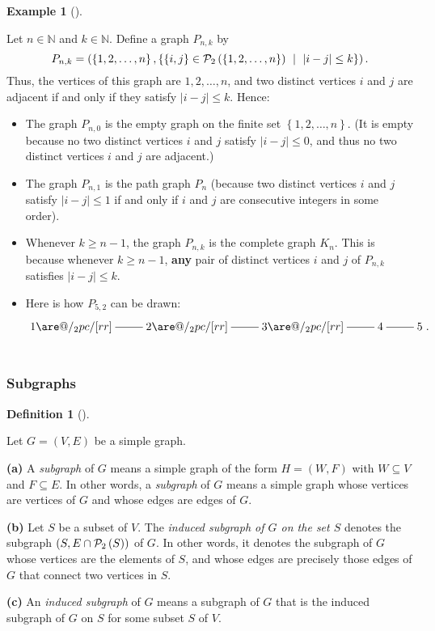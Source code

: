 \documentclass[numbers=enddot,12pt,final,onecolumn,notitlepage]{scrartcl}%
\makeatletter
\theoremstyle{definition}
\newtheorem{defi}[theo]{Definition}
\newenvironment{definition}[1][]
{\begin{defi}[#1]\begin{leftbar}}
{\end{leftbar}\end{defi}}
\newtheorem{exam}[theo]{Example}
\newenvironment{example}[1][]
{\begin{exam}[#1]\begin{leftbar}}
{\end{leftbar}\end{exam}}
\newcommand{\NN}{\mathbb{N}}
\newcommand{\powset}[2][]{\ifthenelse{\equal{#2}{}}{\mathcal{P}\left(#1\right)}{\mathcal{P}_{#1}\left(#2\right)}}
\newcommand{\set}[1]{\left\{ #1 \right\}}
\newcommand{\abs}[1]{\left| #1 \right|}
\newcommand{\tup}[1]{\left( #1 \right)}
\newcommand{\are}{\ar@{-}}
\makeatother
\begin{document}
\begin{example} \label{exa.intro.interval-graph-easy}
Let $n \in \NN$ and $k \in \NN$. Define a graph $P_{n, k}$ by
\[
P_{n, k}
= \tup{\set{1, 2, \ldots, n},
       \set{ \set{i, j} \in \powset[2]{\set{1, 2, \ldots, n}} \ \mid
             \  \abs{i-j} \leq k }} .
\]
Thus, the vertices of this graph are $1, 2, \ldots, n$, and two
distinct vertices $i$ and $j$ are adjacent if and only if they
satisfy $\abs{i-j} \leq k$. Hence:
\begin{itemize}
\item The graph $P_{n, 0}$ is the empty graph on the finite set
      $\set{1, 2, \ldots, n}$. (It is empty because no two distinct
      vertices $i$ and $j$ satisfy $\abs{i-j} \leq 0$, and thus no
      two distinct vertices $i$ and $j$ are adjacent.)
\item The graph $P_{n, 1}$ is the path graph $P_n$ (because two
      distinct vertices $i$ and $j$ satisfy $\abs{i-j} \leq 1$ if and
      only if $i$ and $j$ are consecutive integers in some order).
\item Whenever $k \geq n-1$, the graph $P_{n, k}$ is the complete
      graph $K_n$. This is because whenever $k \geq n-1$,
      \textbf{any} pair of distinct vertices $i$ and $j$ of
      $P_{n, k}$ satisfies $\abs{i-j} \leq k$.
\item Here is how $P_{5, 2}$ can be drawn:
      \begin{align*}
      \xymatrix{ 1 \are[r] \are@/_2pc/[rr] & 2 \are[r] \are@/_2pc/[rr] & 3 \are[r] \are@/_2pc/[rr] & 4 \are[r] & 5 } . \\
      \phantom{a} %
      \end{align*}
\end{itemize}

\end{example}

\subsubsection{Subgraphs}

\begin{definition} \label{def.intro.subgraph}
Let $G = \tup{V, E}$ be a simple graph.

\textbf{(a)} A \textit{subgraph} of $G$ means a simple graph of the
form $H = \tup{W, F}$ with $W \subseteq V$ and $F \subseteq E$. In
other words, a \textit{subgraph} of $G$ means a simple graph whose
vertices are vertices of $G$ and whose edges are edges of $G$.

\textbf{(b)} Let $S$ be a subset of $V$. The \textit{induced subgraph
of $G$ on the set $S$} denotes the subgraph
$\tup{S, E \cap \powset[2]{S}}$ of $G$. In other words, it denotes
the subgraph of $G$ whose vertices are the elements of $S$, and whose
edges are precisely those edges of $G$ that connect two vertices in
$S$.

\textbf{(c)} An \textit{induced subgraph} of $G$ means a subgraph of
$G$ that is the induced subgraph of $G$ on $S$ for some subset $S$ of
$V$.
\end{definition}
\end{document}
